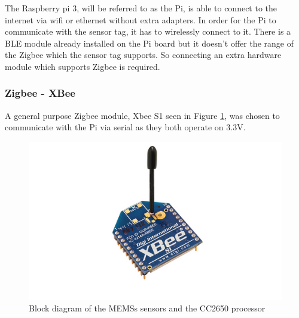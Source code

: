 The Raspberry pi 3, will be referred to as the Pi, is able to connect to the internet via wifi or ethernet without extra adapters. In order for the Pi to communicate with the sensor tag, it has to wirelessly connect to it. There is a BLE module already installed on the Pi board but it doesn't offer the range of the Zigbee \cite{zigbee} which the sensor tag supports. So connecting an extra hardware module which supports Zigbee is required.

\subsubsection{Zigbee - XBee}

A general purpose Zigbee module, Xbee S1 \cite{xbee} seen in Figure \ref{fig:Xbees}, was chosen to communicate with the Pi via serial as they both operate on 3.3V.

\begin{figure}[!h]
	\includegraphics[width=\linewidth]{xbee}
	\caption{Block diagram of the MEMSs sensors and the CC2650 processor \cite{xbee}}
	\label{fig:Xbees}
\end{figure}




